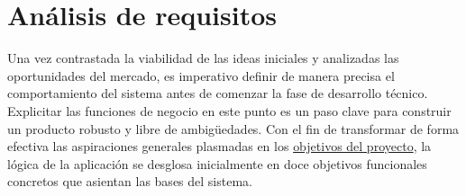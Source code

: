 \chapter{Análisis de requisitos}\label{cap:analisis_de_requisitos}

Una vez contrastada la viabilidad de las ideas iniciales y analizadas las oportunidades del mercado, es imperativo definir de manera precisa el comportamiento del sistema antes de comenzar la fase de desarrollo técnico. Explicitar las funciones de negocio en este punto es un paso clave para construir un producto robusto y libre de ambigüedades. Con el fin de transformar de forma efectiva las aspiraciones generales plasmadas en los \hyperref[sec:objetivos_del_proyecto]{objetivos del proyecto}, la lógica de la aplicación se desglosa inicialmente en doce objetivos funcionales concretos que asientan las bases del sistema.


